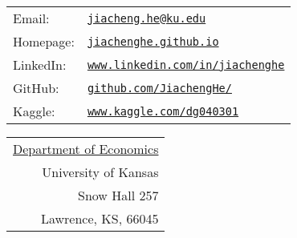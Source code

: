 \documentclass[letterpaper, 11pt]{article}
\def\name{Jiacheng He}
\renewenvironment{itemize}{
  \begin{list}{}{
    \setlength{\leftmargin}{1.5em}
  }
}{
  \end{list}
}
\begin{document}
\hspace{1cm}{\huge \name}


\vspace{0.25in}

\hspace{0.8cm}
\begin{minipage}{0.67\linewidth}
	\begin{tabular}{ll}
		Email: & \href{mailto:jiacheng.he@ku.edu}{\tt jiacheng.he@ku.edu} \\
		Homepage: & \href{https://jiachenghe.github.io}{\tt jiachenghe.github.io} \\
		LinkedIn: & \href{https://www.linkedin.com/in/jiachenghe}{\tt www.linkedin.com/in/jiachenghe} \\
		GitHub: & \href{https://github.com/JiachengHe/}{\tt github.com/JiachengHe/} \\
		Kaggle: & \href{https://www.kaggle.com/dg040301}{\tt www.kaggle.com/dg040301} \\
	\end{tabular}

\end{minipage}
\begin{minipage}{0.4\linewidth}
	\begin{tabular}{r}
		\href{http://economics.ku.edu}{Department of Economics} \\
		University of Kansas \\
		Snow Hall 257 \\
		Lawrence, KS, 66045\\
	\end{tabular}	
\end{minipage}

\end{document}
